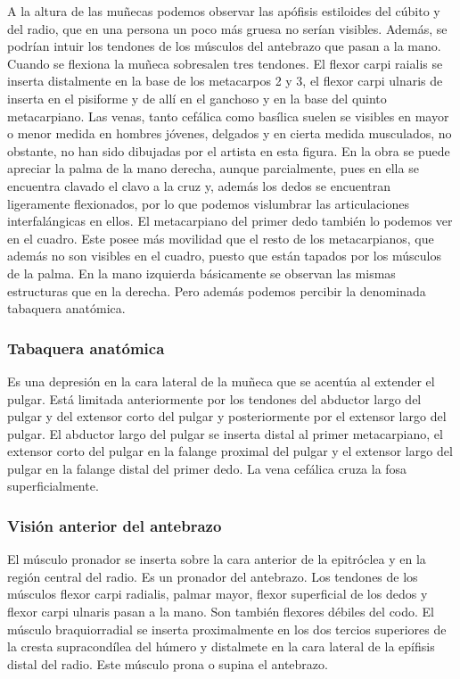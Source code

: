 A la altura de las muñecas podemos observar las apófisis estiloides del cúbito y del radio, que en una persona un poco más gruesa no serían visibles. Además, se podrían intuir los tendones de los músculos del antebrazo que pasan a la mano. Cuando se flexiona la muñeca sobresalen tres tendones. El flexor carpi raialis se inserta distalmente en la base de los metacarpos 2 y 3, el flexor carpi ulnaris de inserta en el pisiforme y de allí en el ganchoso y en la base del quinto metacarpiano.
Las venas, tanto cefálica como basílica suelen se visibles en mayor o menor medida en hombres jóvenes, delgados y en cierta medida musculados, no obstante, no han sido dibujadas por el artista en esta figura.
En la obra se puede apreciar la palma de la mano derecha, aunque parcialmente, pues en ella se encuentra clavado el clavo a la cruz y, además los dedos se encuentran ligeramente flexionados, por lo que podemos vislumbrar las articulaciones interfalángicas en ellos. El metacarpiano del primer dedo también lo podemos ver en el cuadro. Este posee más movilidad que el resto de los metacarpianos, que además no son visibles en el cuadro, puesto que están tapados por los músculos de la palma.
En la mano izquierda básicamente se observan las mismas estructuras que en la derecha. Pero además podemos percibir la denominada tabaquera anatómica.
\subsubsection{Tabaquera anatómica}
Es una depresión en la cara lateral de la muñeca que se acentúa al extender el pulgar. Está limitada anteriormente por los tendones del abductor largo del pulgar y del extensor corto del pulgar y posteriormente por el extensor largo del pulgar. 
El abductor largo del pulgar se inserta distal al primer metacarpiano, el extensor corto del pulgar en la falange proximal del pulgar y el extensor largo del pulgar en la falange distal del primer dedo. La vena cefálica cruza la fosa superficialmente.
\subsubsection{Visión anterior del antebrazo}
El músculo pronador se inserta sobre la cara anterior de la epitróclea y en la región central del radio. Es un pronador del antebrazo. Los tendones de los músculos flexor carpi radialis, palmar mayor, flexor superficial de los dedos y flexor carpi ulnaris pasan a la mano. Son también flexores débiles del codo.
El músculo braquiorradial se inserta proximalmente  en los dos tercios superiores de la cresta supracondílea del húmero y distalmete en la cara lateral de la epífisis distal del radio. Este músculo prona o supina el antebrazo.


